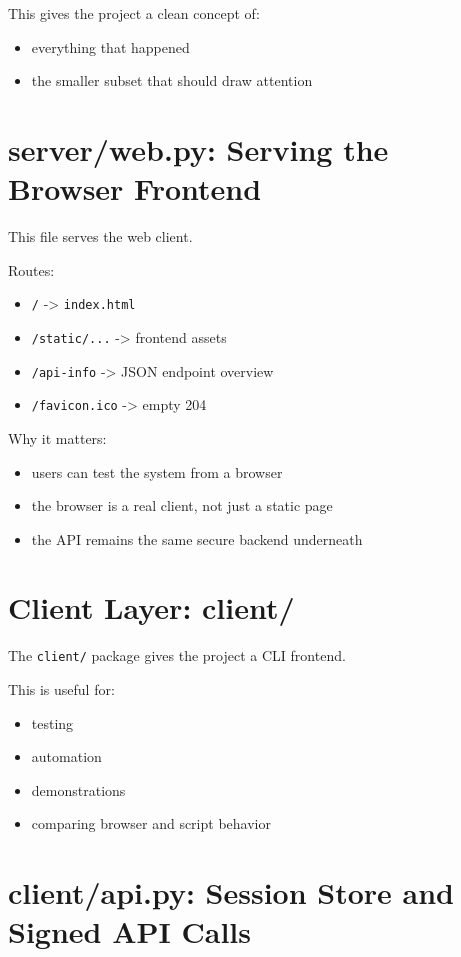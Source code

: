 \documentclass[11pt,a4paper]{article}
\begin{document}
This gives the project a clean concept of:

\begin{itemize}
\item everything that happened
\item the smaller subset that should draw attention
\end{itemize}


\section{server/web.py: Serving the Browser Frontend}

This file serves the web client.

Routes:

\begin{itemize}
\item \nolinkurl{/} -> \nolinkurl{index.html}
\item \nolinkurl{/static/...} -> frontend assets
\item \nolinkurl{/api-info} -> JSON endpoint overview
\item \nolinkurl{/favicon.ico} -> empty 204
\end{itemize}

Why it matters:

\begin{itemize}
\item users can test the system from a browser
\item the browser is a real client, not just a static page
\item the API remains the same secure backend underneath
\end{itemize}


\section{Client Layer: client/}

The \nolinkurl{client/} package gives the project a CLI frontend.

This is useful for:

\begin{itemize}
\item testing
\item automation
\item demonstrations
\item comparing browser and script behavior
\end{itemize}


\section{client/api.py: Session Store and Signed API Calls}
\end{document}
